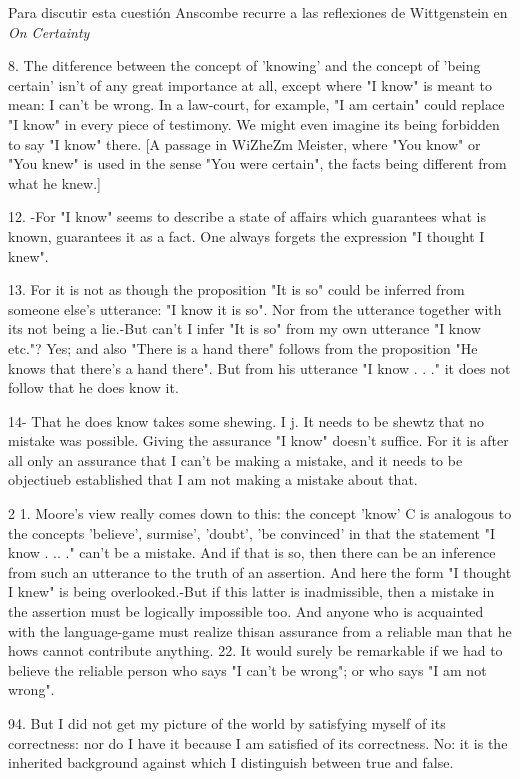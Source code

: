 Para discutir esta cuestión Anscombe recurre a las reflexiones de Wittgenstein
en \emph{On Certainty}



8. The ditference between the concept of 'knowing' and the concept of 'being
certain' isn't of any great importance at all, except where "I know" is meant to
mean: I can't be wrong. In a law-court, for example, "I am certain" could
replace "I know" in every piece of testimony. We might even imagine its being
forbidden to say "I know" there. [A passage in WiZheZm Meister, where "You know"
or "You knew" is used in the sense "You were certain", the facts being different
from what he knew.]

12. -For "I know" seems to describe a state of affairs which guarantees what is
known, guarantees it as a fact. One always forgets the expression "I thought I
knew".

13. For it is not as though the proposition "It is so" could be inferred from
someone else's utterance: "I know it is so". Nor from the utterance together
with its not being a lie.-But can't I infer "It is so" from my own utterance "I
know etc."? Yes; and also "There is a hand there" follows from the proposition
"He knows that there's a hand there". But from his utterance "I know . . ." it
does not follow that he does know it.

14- That he does know takes some shewing. I j. It needs to be shewtz that no
mistake was possible. Giving the assurance "I know" doesn't suffice. For it is
after all only an assurance that I can't be making a mistake, and it needs to be
objectiueb established that I am not making a mistake about that.

2 1. Moore's view really comes down to this: the concept 'know' C is analogous
to the concepts 'believe', surmise', 'doubt', 'be convinced' in that the
statement "I know . .. ." can't be a mistake. And if that is so, then there can
be an inference from such an utterance to the truth of an assertion. And here
the form "I thought I knew" is being overlooked.-But if this latter is
inadmissible, then a mistake in the assertion must be logically impossible too.
And anyone who is acquainted with the language-game must realize thisan
assurance from a reliable man that he hows cannot contribute anything. 22. It
would surely be remarkable if we had to believe the reliable person who says "I
can't be wrong"; or who says "I am not wrong".

94. But I did not get my picture of the world by satisfying
myself of its correctness: nor do I have it because I am satisfied
of its correctness. No: it is the inherited background against
which I distinguish between true and false.



